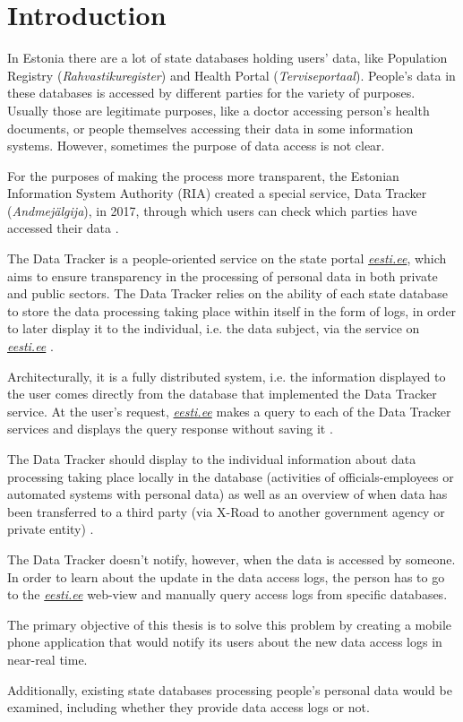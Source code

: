 \section{Introduction} \label{Introduction}

In Estonia there are a lot of state databases holding users' data, like Population Registry (\textit{Rahvastikuregister}) and Health Portal (\textit{Terviseportaal}). People's data in these databases is accessed by different parties for the variety of purposes. Usually those are legitimate purposes, like a doctor accessing person's health documents, or people themselves accessing their data in some information systems. However, sometimes the purpose of data access is not clear.

For the purposes of making the process more transparent, the Estonian Information System Authority (RIA) created a special service, Data Tracker (\textit{Andmejälgija}), in 2017, through which users can check which parties have accessed their data \cite{err-population-registry-unauthorized-access}. 

The Data Tracker is a people-oriented service on the state portal \textit{\href{https://www.eesti.ee}{eesti.ee}}, which aims to ensure transparency in the processing of personal data in both private and public sectors. The Data Tracker relies on the ability of each state database to store the data processing taking place within itself in the form of logs, in order to later display it to the individual, i.e. the data subject, via the service on \textit{\href{https://www.eesti.ee}{eesti.ee}} \cite{aj-github}.

Architecturally, it is a fully distributed system, i.e. the information displayed to the user comes directly from the database that implemented the Data Tracker service. At the user's request, \textit{\href{https://www.eesti.ee}{eesti.ee}} makes a query to each of the Data Tracker services and displays the query response without saving it \cite{aj-github}.

The Data Tracker should display to the individual information about data processing taking place locally in the database (activities of officials-employees or automated systems with personal data) as well as an overview of when data has been transferred to a third party (via X-Road to another government agency or private entity) \cite{aj-github}.

The Data Tracker doesn't notify, however, when the data is accessed by someone. In order to learn about the update in the data access logs, the person has to go to the \textit{\href{https://www.eesti.ee}{eesti.ee}} web-view and manually query access logs from specific databases. 

The primary objective of this thesis is to solve this problem by creating a mobile phone application that would notify its users about the new data access logs in near-real time. 

Additionally, existing state databases processing people's personal data would be examined, including whether they provide data access logs or not.